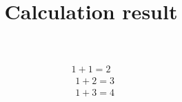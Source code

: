 \documentclass[9pt,dvipdfmx,a4paper]{jsarticle}
\begin{document}
    
\title{Calculation result} 
\date{} 
\maketitle
\begin{align*}
1 + 1 = 2
\end{align*}
\begin{align*}
& 1 + 2 = 3\\ 
& 1 + 3 = 4
\end{align*}
\end{document}
